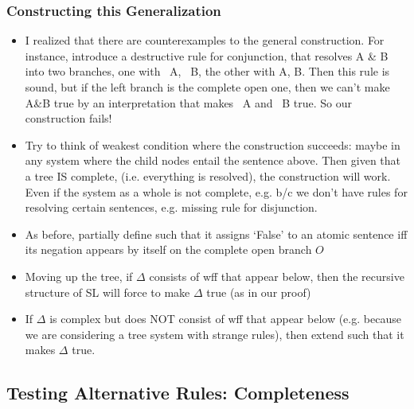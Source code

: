 \begin{frame}
\frametitle{Constructing this Generalization}

\begin{itemize}[<+->]

\item I realized that there are counterexamples to the general construction. For instance, introduce a destructive rule for conjunction, that resolves A & B into two branches, one with ~A, ~B, the other with A, B. Then this rule is sound, but if the left branch is the complete open one, then we can't make A&B true by an interpretation that makes ~A and ~B true. So our construction fails! 

\item Try to think of weakest condition where the construction succeeds: maybe in any system where the child nodes entail the sentence above. Then given that a tree IS complete, (i.e. everything is resolved), the construction will work. Even if the system as a whole is not complete, e.g. b/c we don't have rules for resolving certain sentences, e.g. missing rule for disjunction. 

\item As before, partially define  such that it assigns `False' to an atomic sentence iff its negation appears by itself on the complete open branch $O$

\item Moving up the tree, if $\Delta$ consists of wff that appear below, then the recursive structure of SL will force  to make $\Delta$ true (as in our proof)

\item If $\Delta$ is complex but does NOT consist of wff that appear below (e.g. because we are considering a tree system with strange rules), then extend  such that it makes $\Delta$ true. 

\end{itemize}
\end{frame}

\fi 

\subsection{Testing Alternative Rules: Completeness}



